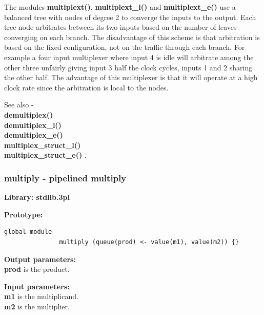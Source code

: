             The modules {\bf multiplext()}, {\bf multiplext\_l()} and {\bf
            multiplext\_e()} use a balanced tree with nodes of degree 2 to
            converge the inputs to the output. Each tree node arbitrates between
            its two inputs based on the number of leaves converging on each
            branch. The disadvantage of this scheme is that arbitration is
            based on the fixed configuration, not on the traffic through
            each branch. For example a four input multiplexer where
            input 4 is idle will arbitrate among the other three unfairly
            giving input 3 half the clock cycles, inputs 1 and 2 sharing the
            other half. The advantage of this multiplexer is that it will
            operate at a high clock rate since the arbitration is local to
            the nodes.
                        
            See also - \\
            {\bf demultiplex()}  \\
            {\bf demultiplex\_l()}  \\
            {\bf demultiplex\_e()}  \\
            {\bf multiplex\_struct\_l()}  \\
            {\bf multiplex\_struct\_e()} .
        




        \subsubsection{multiply - pipelined multiply}\label{sec:lmmultiply}

            {\bf Library: stdlib.3pl}

            {\bf Prototype:} \\
            \vsp
            \begin{lstlisting}[gobble=12, language=threepl]
               global module
               multiply (queue(prod) <- value(m1), value(m2)) {}
            \end{lstlisting}

            {\bf Output parameters:} \\
            {\bf prod} is the product.

            {\bf Input parameters:} \\
            {\bf m1} is the multiplicand.\\
            {\bf m2} is the multiplier.
            
